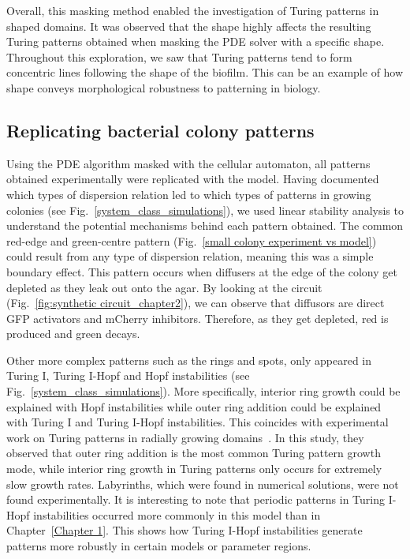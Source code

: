 Overall, this masking method enabled the investigation of Turing patterns in shaped domains.
It was observed that the shape highly affects the resulting Turing patterns obtained when masking the PDE solver with a specific shape.
Throughout this exploration, we saw that Turing patterns tend to form concentric lines following the shape of the biofilm.
This can be an example of how shape conveys morphological robustness to patterning in biology.


\subsection{Replicating bacterial colony patterns}
Using the PDE algorithm masked with the cellular automaton, all patterns obtained experimentally were replicated with the model.
Having documented which types of dispersion relation led to which types of patterns in growing colonies (see Fig.~\ref{system_class_simulations}), we used linear stability analysis to understand the potential mechanisms behind each pattern obtained.
The common red-edge and green-centre pattern (Fig.~\ref{small colony experiment vs model}) could result from any type of dispersion relation, meaning this was a simple boundary effect.
This pattern occurs when diffusers at the edge of the colony get depleted as they leak out onto the agar.
By looking at the circuit (Fig.~\ref{fig:synthetic circuit_chapter2}), we can observe that diffusors are direct GFP activators and mCherry inhibitors.
Therefore, as they get depleted, red is produced and green decays.

Other more complex patterns such as the rings and spots, only appeared in Turing I, Turing I-Hopf and Hopf instabilities (see Fig.~\ref{system_class_simulations}).
More specifically, interior ring growth could be explained with Hopf instabilities while outer ring addition could be explained with Turing I and Turing I-Hopf instabilities.
This coincides with experimental work on Turing patterns in radially growing domains~\parencite{Konow2019}.
In this study, they observed that outer ring addition is the most common Turing pattern growth mode, while interior ring growth in Turing patterns only occurs for extremely slow growth rates.
Labyrinths, which were found in numerical solutions, were not found experimentally.
It is interesting to note that periodic patterns in Turing I-Hopf instabilities occurred more commonly in this model than in Chapter~\ref{Chapter 1}.
This shows how Turing I-Hopf instabilities generate patterns more robustly in certain models or parameter regions.

